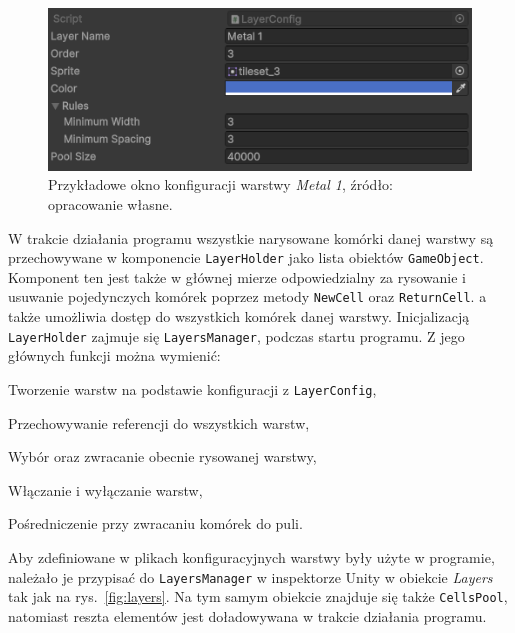 \begin{figure}[h]
    \centering
    \includegraphics[width=.9\textwidth]{chapters/chapter4/rys/layer_config}
    \caption[Przykładowe okno konfiguracji warstwy \textit{Metal 1}.]
    {Przykładowe okno konfiguracji warstwy \textit{Metal 1}, źródło: opracowanie własne.}
    \label{fig:layer_config}
\end{figure}

\indent W trakcie działania programu wszystkie narysowane komórki danej warstwy
są przechowywane w komponencie \texttt{LayerHolder} jako lista obiektów \texttt{GameObject}.
Komponent ten jest także w głównej mierze odpowiedzialny za rysowanie
i usuwanie pojedynczych komórek poprzez metody \texttt{NewCell} oraz \texttt{ReturnCell}.
a także umożliwia dostęp do wszystkich komórek danej warstwy.
Inicjalizacją \texttt{LayerHolder} zajmuje się \texttt{LayersManager}, podczas startu programu.
Z jego głównych funkcji można wymienić:

\begin{citemize}
    \item Tworzenie warstw na podstawie konfiguracji z \texttt{LayerConfig},
    \item Przechowywanie referencji do wszystkich warstw,
    \item Wybór oraz zwracanie obecnie rysowanej warstwy,
    \item Włączanie i wyłączanie warstw,
    \item Pośredniczenie przy zwracaniu komórek do puli.
\end{citemize}

Aby zdefiniowane w plikach konfiguracyjnych warstwy były użyte w programie,
należało je przypisać do \texttt{LayersManager} w inspektorze Unity w obiekcie \textit{Layers} tak jak na rys.~\ref{fig:layers}.
Na tym samym obiekcie znajduje się także \texttt{CellsPool},
natomiast reszta elementów jest doładowywana w trakcie działania programu.

